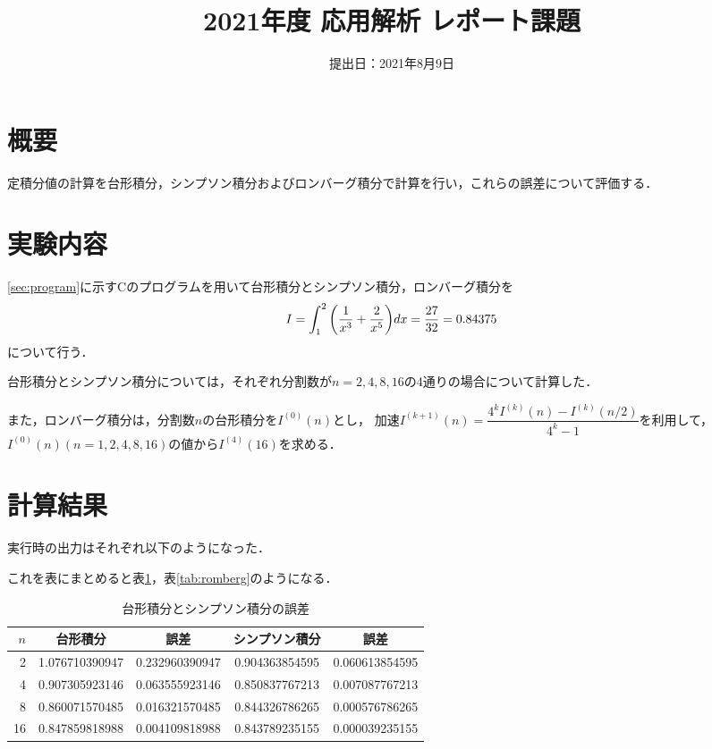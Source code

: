 \documentclass[a4paper]{bxjsarticle}
\title{2021年度 応用解析 レポート課題}
\author{\directlua{tex.print(os.getenv("AUTHOR_NAME"))}}
\date{提出日：2021年8月9日}
\begin{document}
	\maketitle


	\section{概要}
	定積分値の計算を台形積分，シンプソン積分およびロンバーグ積分で計算を行い，これらの誤差について評価する．


	\section{実験内容}
	\ref{sec:program}に示すCのプログラムを用いて台形積分とシンプソン積分，ロンバーグ積分を
	\begin{equation}
		I=\int_{1}^{2}\qty(\frac{1}{x^3}+\frac{2}{x^5})dx=\frac{27}{32}=0.84375
	\end{equation}
	について行う．

	台形積分とシンプソン積分については，それぞれ分割数が$n=2,4,8,16$の4通りの場合について計算した．

	また，ロンバーグ積分は，分割数$n$の台形積分を$I^{(0)}(n)$とし，
	加速$I^{(k+1)}(n)=\dfrac{4^k I^{(k)}(n)-I^{(k)}(n/2)}{4^k-1}$を利用して，
	$I^{(0)}(n)(n=1,2,4,8,16)$の値から$I^{(4)}(16)$を求める．


	\section{計算結果}
	実行時の出力はそれぞれ以下のようになった．


	\noindent
	これを表にまとめると表\ref{tab:trap_simpson}，表\ref{tab:romberg}のようになる．

	\begin{table}[bt]
		\caption{台形積分とシンプソン積分の誤差}
		\label{tab:trap_simpson}
		\begin{center}
			\begin{tabular}{r|cc|cc}\hline
				$n$ & 台形積分 & 誤差 & シンプソン積分 & 誤差 \\ \hline
				2 & 1.076710390947 & 0.232960390947 & 0.904363854595 & 0.060613854595 \\
				4 & 0.907305923146 & 0.063555923146 & 0.850837767213 & 0.007087767213 \\
				8 & 0.860071570485 & 0.016321570485 & 0.844326786265 & 0.000576786265 \\
				16 & 0.847859818988 & 0.004109818988 & 0.843789235155 & 0.000039235155 \\ \hline
			\end{tabular}
		\end{center}
	\end{table}
\end{document}

